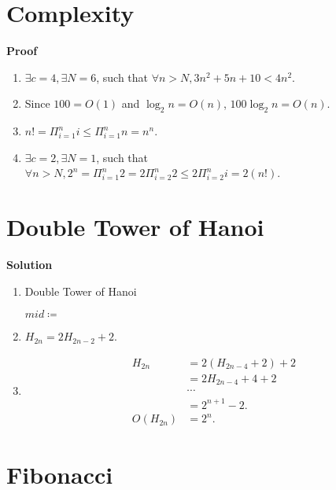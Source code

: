\documentclass{../../cls/sig-alternate-05-2015}
\begin{document}
\section{Complexity}
\textbf{Proof}\begin{enumerate}[label=(\alph*)]
	\item $\exists c = 4, \exists N = 6$, such that $\forall n > N, 3n^2 + 5n + 10 < 4n^2$.
	\item Since $100 = O(1)$ and $\log_2 n = O(n)$, $100\log_2 n = O(n)$.
	\item $n! = \Pi_{i = 1}^n i \le \Pi_{i = 1}^n n = n^n$.
	\item $\exists c = 2, \exists N = 1$, such that $\forall n > N, 2^n = \Pi_{i = 1}^n 2 = 2 \Pi_{i = 2}^n 2 \le 2 \Pi_{i = 2}^n i = 2(n!)$.
\end{enumerate}

\section{Double Tower of Hanoi}
\textbf{Solution}\begin{enumerate}[label=(\alph*)]
	\item \begin{algorithm}[H]
		\caption{Double Tower of Hanoi}
		\label{a-3}
		\begin{algorithmic}
			\State \Return
			\State {}
			\State {}
			\Else
			\State $mid \coloneqq$ 
			\State {}
			\State {}
			\State {}
			\EndIf
			\EndProcedure
		\end{algorithmic}
	\end{algorithm}

	\item $H_{2n} = 2H_{2n - 2} + 2$.
	\item \begin{align}
		H_{2n} & = 2(H_{2n - 4} + 2) + 2\\
		& = 2H_{2n - 4} + 4 + 2\\
		& \cdots\\
		& = 2^{n + 1} - 2.\\
		O(H_{2n}) & = 2^n.
	\end{align}
\end{enumerate}

\section{Fibonacci}
\end{document}
